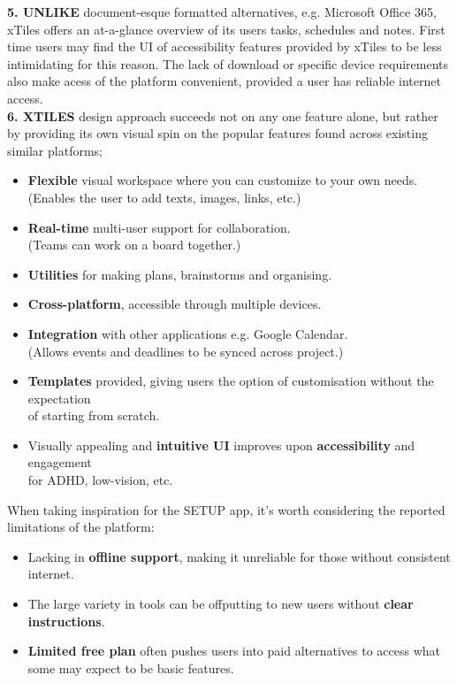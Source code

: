 \textbf{5. UNLIKE} 
document-esque formatted alternatives, e.g. Microsoft Office 365, xTiles offers an at-a-glance overview of its users tasks, schedules and notes. First time users may find the UI of accessibility features provided by xTiles to be less intimidating for this reason. The lack of download or specific device requirements also make acess of the platform convenient, provided a user has reliable internet access.\\

\textbf{6. XTILES} design approach succeeds not on any one feature alone, but rather by providing its own visual spin on the popular features found across existing similar platforms;\\
\begin{itemize}
    \vspace{-0.5\baselineskip}
\item \textbf{Flexible} visual workspace where you can customize to your own needs.\\ (Enables the user to add texts, images, links, etc.)
\item \textbf{Real-time} multi-user support for collaboration.\\ (Teams can work on a board together.)
\item \textbf{Utilities} for making plans, brainstorms and organising.
\item \textbf{Cross-platform}, accessible through multiple devices.
\item \textbf{Integration} with other applications e.g. Google Calendar.\\ (Allows events and deadlines to be synced across project.)
\item  \textbf{Templates} provided, giving users the option of customisation without the expectation\\ of starting from scratch.
\item Visually appealing and \textbf{intuitive UI} improves upon \textbf{accessibility} and engagement \\for ADHD, low-vision, etc.
\end{itemize}

When taking inspiration for the SETUP app, it's worth considering the reported limitations\cite{xtrev} of the platform:
\begin{itemize}
\item  Lacking in \textbf{offline support}, making it unreliable for those without consistent internet.
\item The large variety in tools can be offputting to new users without \textbf{clear instructions}. 
\item \textbf{Limited free plan} often pushes users into paid alternatives to access what some may expect to be basic features.
\end{itemize}

